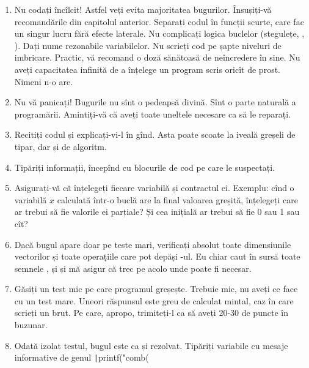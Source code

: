 \documentclass[../main.tex]{subfiles}
\begin{document}
\begin{enumerate}
  \item Nu codați încîlcit! Astfel veți evita majoritatea bugurilor. Însușiți-vă recomandările din capitolul anterior. Separați codul în funcții scurte, care fac un singur lucru fără efecte laterale. Nu complicați logica buclelor (stegulețe, , ). Dați nume rezonabile variabilelor. Nu scrieți cod pe șapte niveluri de imbricare. Practic, vă recomand o doză sănătoasă de neîncredere în sine. Nu aveți capacitatea infinită de a înțelege un program scris oricît de prost. Nimeni n-o are.

  \item Nu vă panicați! Bugurile nu sînt o pedeapsă divină. Sînt o parte naturală a programării. Amintiți-vă că aveți toate uneltele necesare ca să le reparați.

  \item Recitiți codul și explicați-vi-l în gînd. Asta poate scoate la iveală greșeli de tipar, dar și de algoritm.

  \item Tipăriți informații, începînd cu blocurile de cod pe care le suspectați.

  \item Asigurați-vă că înțelegeți fiecare variabilă și contractul ei. Exemplu: cînd o variabilă $x$ calculată într-o buclă are la final valoarea greșită, înțelegeți care ar trebui să fie valorile ei parțiale? Și cea inițială ar trebui să fie 0 sau 1 sau cît?

  \item Dacă bugul apare doar pe teste mari, verificați absolut toate dimensiunile vectorilor și toate operațiile care pot depăși -ul. Eu chiar caut în sursă toate semnele \ccode{+}, \ccode{-} și \ccode{*} și mă asigur că trec pe  acolo unde poate fi necesar.

  \item Găsiți un test mic pe care programul greșește. Trebuie mic, nu aveți ce face cu un test mare. Uneori răspunsul este greu de calculat mintal, caz în care scrieți un brut. Pe care, apropo, trimiteți-l ca să aveți 20-30 de puncte în buzunar.

  \item Odată izolat testul, bugul este ca și rezolvat. Tipăriți variabile cu mesaje informative de genul \texttt|printf("comb(%
\end{enumerate}
\end{document}
